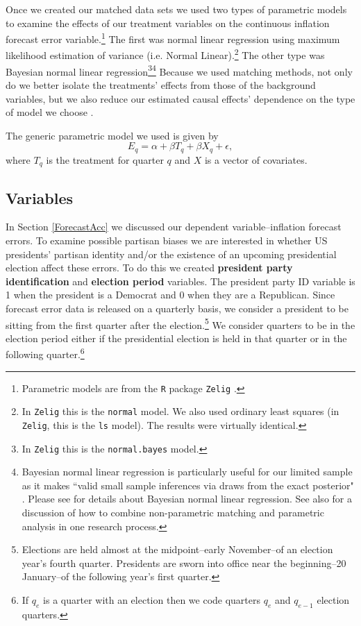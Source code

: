 \documentclass[a4paper]{article}\usepackage{graphicx, color}
\begin{document}
Once we created our matched data sets we used two types of parametric models to examine the effects of our treatment variables on the continuous inflation forecast error variable.\footnote{Parametric models are from the \texttt{R} package \texttt{Zelig} \citep{Zelig2012}.} The first was normal linear regression using maximum likelihood estimation of variance (i.e. Normal Linear).\footnote{In {\tt{Zelig}} this is the {\tt{normal}} model. We also used ordinary least squares (in \texttt{Zelig}, this is the \texttt{ls} model). The results were virtually identical.} The other type was Bayesian normal linear regression\footnote{In {\tt{Zelig}} this is the {\tt{normal.bayes}} model.}\footnote{Bayesian normal linear regression is particularly useful for our limited sample as it makes ``valid small sample inferences via draws from the exact posterior" \citep[][38]{Zelig2012}. Please see \cite{Goodrich2007} for details about Bayesian normal linear regression.  See also \cite{Imai2008} for a discussion of how to combine non-parametric matching and parametric analysis in one research process.} Because we used  matching methods, not only do we better isolate the treatments' effects from those of the background variables, but we also reduce our estimated causal effects' dependence on the type of model we choose \cite[200--201]{Ho2007}.

The generic parametric model we used is given by
%
\begin{equation}
    E_{q} = \alpha + \beta T_{q} + \beta X_{q} + \epsilon,
\end{equation}
%
where $T_{q}$ is the treatment for quarter $q$ and $X$ is a vector of covariates. 

\subsection{Variables}

In Section \ref{ForecastAcc} we discussed our dependent variable--inflation forecast errors. To examine possible partisan biases we are interested in whether US presidents' partisan identity and/or the existence of an upcoming presidential election affect these errors. To do this we created {\bf{president party identification}} and {\bf{election period}} variables. The president party ID variable is 1 when the president is a Democrat and 0 when they are a Republican. Since forecast error data is released on a quarterly basis, we consider a president to be sitting from the first quarter after the election.\footnote{Elections are held almost at the midpoint--early November--of an election year's fourth quarter. Presidents are sworn into office near the beginning--20 January--of the following year's first quarter.} We consider quarters to be in the election period either if the presidential election is held in that quarter or in the following quarter.\footnote{If $q_{e}$ is a quarter with an election then we code quarters $q_{e}$ and $q_{e-1}$ election quarters.}
\end{document}
